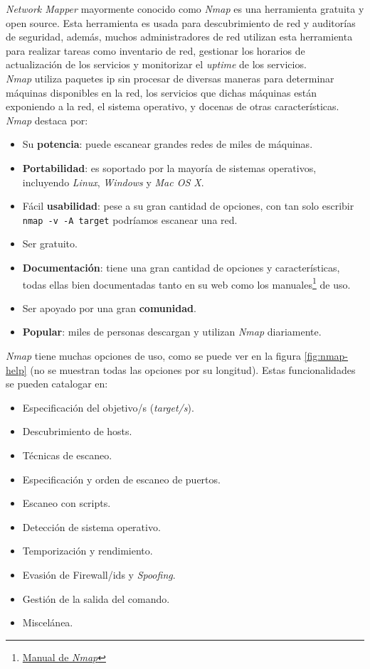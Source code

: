 \textit{Network Mapper} mayormente conocido como \textit{Nmap}\cite{nmap} es una herramienta gratuita y open source. Esta herramienta es usada para descubrimiento de red y auditorías de seguridad, además, muchos administradores de red utilizan esta herramienta para realizar tareas como inventario de red, gestionar los horarios de actualización de los servicios y monitorizar el \textit{uptime} de los servicios.\\

\textit{Nmap} utiliza paquetes \acrshort{ip} sin procesar de diversas maneras para determinar máquinas disponibles en la red, los servicios que dichas máquinas están exponiendo a la red, el sistema operativo, y docenas de otras características.\\

\textit{Nmap} destaca por:

\begin{itemize}
    \item Su \textbf{potencia}: puede escanear grandes redes de miles de máquinas.
    \item \textbf{Portabilidad}: es soportado por la mayoría de sistemas operativos, incluyendo \textit{Linux}, \textit{Windows} y \textit{Mac OS X}.
    \item Fácil \textbf{usabilidad}: pese a su gran cantidad de opciones, con tan solo escribir \texttt{nmap -v -A target} podríamos escanear una red.
    \item Ser gratuito.
    \item \textbf{Documentación}: tiene una gran cantidad de opciones y características, todas ellas bien documentadas tanto en su web como los manuales\footnote{\href{https://linux.die.net/man/1/nmap}{Manual de \textit{Nmap}}} de uso.
    \item Ser apoyado por una gran \textbf{comunidad}.
    \item \textbf{Popular}: miles de personas descargan y utilizan \textit{Nmap} diariamente.
\end{itemize}

\textit{Nmap} tiene muchas opciones de uso, como se puede ver en la figura \ref{fig:nmap-help} (no se muestran todas las opciones por su longitud). Estas funcionalidades se pueden catalogar en:

\begin{itemize}
    \item Especificación del objetivo/s (\textit{target/s}).
    \item Descubrimiento de hosts.
    \item Técnicas de escaneo.
    \item Especificación y orden de escaneo de puertos.
    \item Escaneo con scripts.
    \item Detección de sistema operativo.
    \item Temporización y rendimiento.
    \item Evasión de Firewall/\acrshort{ids} y \textit{Spoofing}.
    \item Gestión de la salida del comando.
    \item Miscelánea.
\end{itemize}

